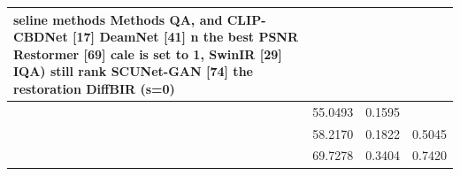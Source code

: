 \begin{tabular}{llll}
\toprule
seline methods Methods QA, and CLIP- CBDNet [17] DeamNet [41] n the best PSNR Restormer [69] cale is set to 1, SwinIR [29] IQA) still rank SCUNet-GAN [74] the restoration DiffBIR (s=0) &  &  &  \\
\midrule
 & 55.0493 & 0.1595 &  \\
 & 58.2170 & 0.1822 & 0.5045 \\
 & 69.7278 & 0.3404 & 0.7420 \\
\bottomrule
\end{tabular}
